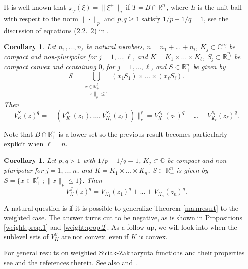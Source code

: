 \documentclass[a4paper,12pt,leqno,english]{article}
\numberwithin{equation}{section}
\newtheorem{corollary+}  [theorem+]  {Corollary}
\newenvironment{corollary}{\begin{corollary+}\sl}{\end{corollary+}\rm}
\begin{document}
It is well known that $\varphi_T(\xi) = \|\xi^+\|_q$ if $T = B \cap \mathbb{R}_+^n$,
    where $B$ is the unit ball with respect to the norm $\| \cdot \|_p$ and $p, q \geq 1$ satisfy $1/p + 1/q = 1$,
    see the discussion of equations ($2.2.12$) in \cite{Hormander:convexity}.
\begin{corollary}
Let $n_1, \dots, n_\ell$ be natural numbers,
    $n = n_1 + \dots + n_\ell$,
    $K_j \subset \mathbb{C}^{n_j}$ be compact and non-pluripolar for $j = 1, \dots, \ell$, and
    $K = K_1 \times \dots \times K_\ell$,
    $S_j \subset \mathbb{R}_+^{n_j}$ be compact convex and containing $0$, for $j = 1, \dots, \ell$, and
    $S \subset \mathbb{R}_+^n$ be given by
\begin{equation*}
    S
    =
    \bigcup_{\substack{x \in \mathbb{R}_+^\ell \\ \|x\|_p \leq 1}}
        (x_1 S_1) \times \dots \times (x_\ell S_\ell).
\end{equation*}
Then
\begin{equation*}
    V^S_K(z)^q
    =
    \|(V^{S_1}_{K_1}(z_1), \dots, V^{S_\ell}_{K_\ell}(z_\ell))\|_q^q
    =
    V^{S_1}_{K_1}(z_1)^q + \dots + V^{S_\ell}_{K_\ell}(z_\ell)^q.
\end{equation*}
\end{corollary}

Note that $B \cap \mathbb{R}_+^n$ is a lower set so the previous result becomes particularly explicit when $\ell = n$.
\begin{corollary}
Let
    $p, q > 1$ with $1/p + 1/q = 1$,
    $K_j \subset \mathbb{C}$ be compact and non-pluripolar for $j = 1, \dots, n$, and
    $K = K_1 \times \dots \times K_n$,
    $S \subset \mathbb{R}_+^n$ is given by $S = \{x \in \mathbb{R}_+^n\,; \|x\|_p \leq 1\}$.
Then
\begin{equation*}
    V^S_K(z)^q
    =
    V_{K_1}(z_1)^q + \dots + V_{K_n}(z_n)^q.
\end{equation*}
\end{corollary}

A natural question is if it is possible to generalize Theorem \ref{mainresult} to the weighted case.
The answer turns out to be negative, as is shown in Propositions \ref{weight:prop.1} and \ref{weight:prop.2}.
As a follow up, we will look into when the sublevel sets of $V^S_K$ are not convex, even if $K$ is convex.

For general results on weighted Siciak-Zakharyuta functions and 
their properties see
\cite{MagSigSigSno:2023} and the references therein.  See also 
\cite{MagSigSig:2023} and \cite{MagSigSno:2023}.
\end{document}
